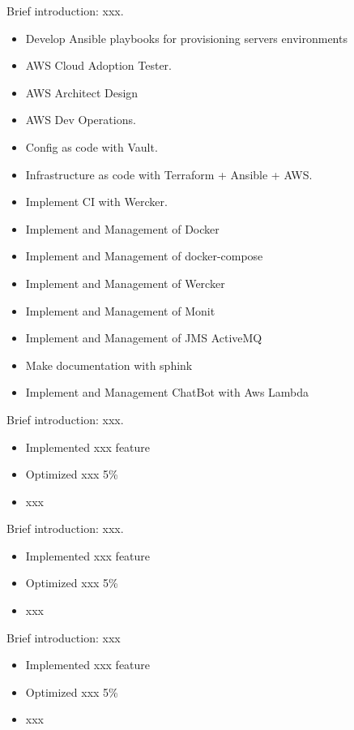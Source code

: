 \documentclass{resume}
\begin{document}
Brief introduction: xxx.
\begin{itemize}
  \item Develop Ansible playbooks for provisioning servers environments
  \item AWS Cloud Adoption Tester.
  \item AWS Architect Design
  \item AWS Dev Operations.
  \item Config as code with Vault.
  \item Infrastructure as code with Terraform + Ansible + AWS.
  \item Implement CI with Wercker.
  \item Implement and Management of Docker
  \item Implement and Management of docker-compose
  \item Implement and Management of Wercker
  \item Implement and Management of Monit
  \item Implement and Management of JMS ActiveMQ
  \item Make documentation with sphink
  \item Implement and Management ChatBot with Aws Lambda
\end{itemize}

Brief introduction: xxx.
\begin{itemize}
  \item Implemented xxx feature
  \item Optimized xxx 5\%
  \item xxx
\end{itemize}

Brief introduction: xxx.
\begin{itemize}
  \item Implemented xxx feature
  \item Optimized xxx 5\%
  \item xxx
\end{itemize}

Brief introduction: xxx
\begin{itemize}
  \item Implemented xxx feature
  \item Optimized xxx 5\%
  \item xxx
\end{itemize}
\end{document}
